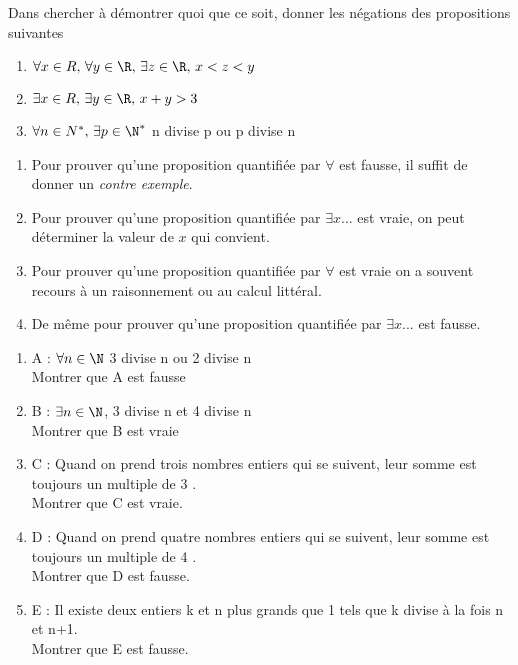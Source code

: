\documentclass[a4paper,12pt]{article}
\begin{document}

\exo{}

Dans chercher à démontrer quoi que ce soit, donner les négations des propositions suivantes

\begin{enumerate}[\bfseries 1.]
	\item 	$\forall x\in R,\, \forall y\in\R,\, \exists z\in \R,\, x<z<y$
	\item 	$\exists x\in R,\, \exists y\in\R,\, x+y>3$
	\item 	$\forall n\in N^*,\, \exists p\in\N^*$ n divise p ou p divise n\\
\end{enumerate}

\exo{}
\begin{methode}
	\begin{enumerate}[\textbullet]
		\item 	Pour prouver qu'une proposition quantifiée par $\forall$ est fausse, il suffit de donner un \textit{contre exemple}.
		\item 	Pour prouver qu'une proposition quantifiée par $\exists x...$ est vraie, on peut déterminer la valeur de $x$ qui convient.
		\item 	Pour prouver qu'une proposition quantifiée par $\forall$ est vraie on a souvent recours à un raisonnement ou au calcul littéral.
		\item 	De même pour prouver qu'une proposition quantifiée par $\exists x...$ est fausse.
	\end{enumerate}
\end{methode}

\begin{enumerate}[\bfseries 1.]
	\item 	A : $\forall n \in \N$ 3 divise n ou 2 divise n\\
			Montrer que A est fausse
	\item 	B : $\exists n \in \N$, 3 divise n et 4 divise n\\
			Montrer que B est vraie
	\item 	C : \og Quand on prend trois nombres entiers qui se suivent, leur somme est toujours un multiple de 3 \fg.\\
			Montrer que C est vraie.
	
	\item 	D : \og Quand on prend quatre nombres entiers qui se suivent, leur somme est toujours un multiple de 4 \fg.\\
				Montrer que D est fausse.
	\item 	E : \og Il existe deux entiers k et n plus grands que 1 tels que k divise à la fois n et n+1.\\
				Montrer que E est fausse. 
\end{enumerate}
\end{document}

